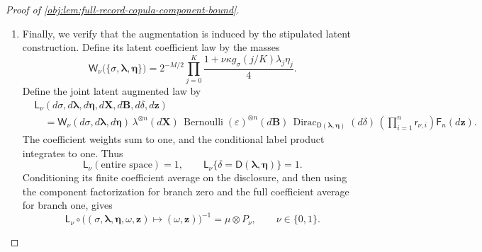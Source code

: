 \begin{proof}[Proof of \cref{obj:lem:full-record-copula-component-bound}]
\begin{enumerate}
For any measurable augmented event
\(\mathsf E_{\mathrm{aug}}\subseteq
 \mathsf\Omega_{\mathrm{aug}}\times\mathsf Z_n\),
define its label section by
\[
\mathsf E_{\mathrm{aug},\omega}
 =\{\mathbf z:(\omega,\mathbf z)\in\mathsf E_{\mathrm{aug}}\}.
\]
The common augmentation marginal implies
\[
\begin{aligned}
&|(\mu\otimes P_0)(\mathsf E_{\mathrm{aug}})
  -(\mu\otimes P_1)(\mathsf E_{\mathrm{aug}})|\\
&\qquad\le
 \int
 |P_0(\omega)(\mathsf E_{\mathrm{aug},\omega})
  -P_1(\omega)(\mathsf E_{\mathrm{aug},\omega})|\,\mu(d\omega)\\
&\qquad\le
 \frac1{16}
 +256\left(\int\mathcal A\,d\mu+\int\mathcal B\,d\mu\right)
 \le\frac1{16}+256\cdot2^{-16}
 =\frac{17}{256}.
\end{aligned}
\]
Taking the supremum over augmented events proves
\[
\operatorname{TV}(\mu\otimes P_0,\mu\otimes P_1)
 \le\frac{17}{256}.
\]

For every measurable original-record event
\(\mathsf E_{\mathrm{rec}}\), its inverse image under \(\mathsf O_L\) is an augmented event. The projection identities from \cref{proof:full-record-copula-component-bound:record-projections} therefore give
\[
\operatorname{TV}(\mathbb P_0,\mathbb P_1)
 \le
 \operatorname{TV}(\mu\otimes P_0,\mu\otimes P_1)
 \le\frac{17}{256}<\frac18.
\]

\item
Finally, we verify that the augmentation is induced by the stipulated latent construction. Define its latent coefficient law by the masses
\[
\mathsf W_\nu
 \bigl(\{\sigma,\boldsymbol\lambda,\boldsymbol\eta\}\bigr)
 =
 2^{-M/2}
 \prod_{j=0}^{K}
 \frac{1+\nu\kappa g_\sigma(j/K)\lambda_j\eta_j}{4}.
\]
Define the joint latent augmented law by
\[
\begin{aligned}
&\mathsf L_\nu
 (d\sigma,d\boldsymbol\lambda,d\boldsymbol\eta,
  d\mathbf X,d\mathbf B,d\delta,d\mathbf z)\\
&\quad=
 \mathsf W_\nu(d\sigma,d\boldsymbol\lambda,d\boldsymbol\eta)\,
 \lambda^{\otimes n}(d\mathbf X)\,
 \operatorname{Bernoulli}(\varepsilon)^{\otimes n}(d\mathbf B)\,
 \operatorname{Dirac}_{\mathsf D(\boldsymbol\lambda,\boldsymbol\eta)}
       (d\delta)\,
 \left(\prod_{i=1}^{n}\mathsf r_{\nu,i}\right)
 \mathsf F_n(d\mathbf z).
\end{aligned}
\]
The coefficient weights sum to one, and the conditional label product integrates to one. Thus
\[
\mathsf L_\nu(\text{entire space})=1,
\qquad
\mathsf L_\nu\{\delta=\mathsf D(\boldsymbol\lambda,\boldsymbol\eta)\}=1.
\]
Conditioning its finite coefficient average on the disclosure, and then using the component factorization for branch zero and the full coefficient average for branch one, gives
\[
\mathsf L_\nu\circ
 \bigl((\sigma,\boldsymbol\lambda,\boldsymbol\eta,\omega,\mathbf z)
       \mapsto(\omega,\mathbf z)\bigr)^{-1}
 =\mu\otimes P_\nu,
\qquad \nu\in\{0,1\}.
\]


\end{enumerate}
\end{proof}
